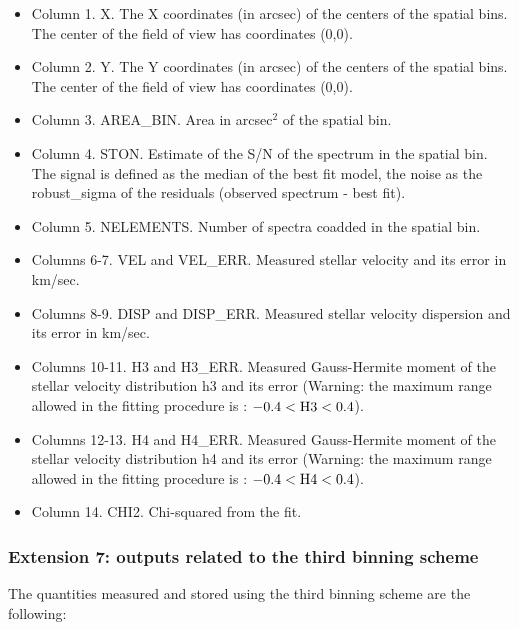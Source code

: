 \begin{itemize}

\item Column 1. X. The X coordinates (in arcsec) of the centers of the spatial bins. The center of the field of view has coordinates (0,0).
\item Column 2. Y. The Y coordinates (in arcsec) of the centers of the spatial bins. The center of the field of view has coordinates (0,0).
\item Column 3. AREA\_BIN. Area in arcsec$^2$ of the spatial bin.
\item Column 4. STON. Estimate of the S/N of the spectrum in the
  spatial bin. The signal is defined as the median of the best fit
  model, the noise as the robust\_sigma of the residuals (observed
  spectrum - best fit).
\item Column 5. NELEMENTS. Number of spectra coadded in the spatial bin.
\item Columns 6-7. VEL and VEL\_ERR. Measured stellar velocity and its error in km/sec.
\item Columns 8-9. DISP and DISP\_ERR. Measured stellar velocity dispersion and its error in km/sec.
\item Columns 10-11. H3 and H3\_ERR. Measured Gauss-Hermite moment of the stellar velocity distribution h3 and its error (Warning: the maximum range allowed in the
  fitting procedure is : $-0.4 < {\rm H3} < 0.4$).
\item Columns 12-13. H4 and H4\_ERR. Measured Gauss-Hermite moment of the stellar velocity distribution h4 and its error (Warning: the maximum range allowed in the
  fitting procedure is : $-0.4 < {\rm H4} < 0.4$).
\item Column 14. CHI2. Chi-squared from the fit.
\end{itemize}

\subsubsection{Extension 7: outputs related to the third binning
  scheme} 


The quantities measured and stored using the third binning scheme are
the following:


